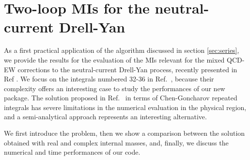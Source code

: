\documentclass[final,1p,times]{elsarticle}
\begin{document}

\section{Two-loop MIs for the neutral-current Drell-Yan}
\label{sec:results}

As a first practical application of the algorithm discussed in section \ref{sec:series}, we provide the results for the evaluation of the MIs relevant for the mixed QCD-EW corrections to the neutral-current Drell-Yan process, recently presented in Ref \cite{Armadillo:2022bgm}. 
%
We focus on the integrals numbered 32-36 in Ref.~\cite{Bonciani:2016ypc},
because their complexity offers an interesting case to study the performances of our new package. The solution proposed in Ref.~\cite{Bonciani:2016ypc} in terms of Chen-Goncharov repeated integrals has severe limitations in the numerical evaluation in the physical region, and a semi-analytical approach represents an interesting alternative.

We first introduce the problem, then we show a comparison between the solution obtained with real and complex internal masses, and, finally, we discuss the numerical and time performances of our code. 
\end{document}
